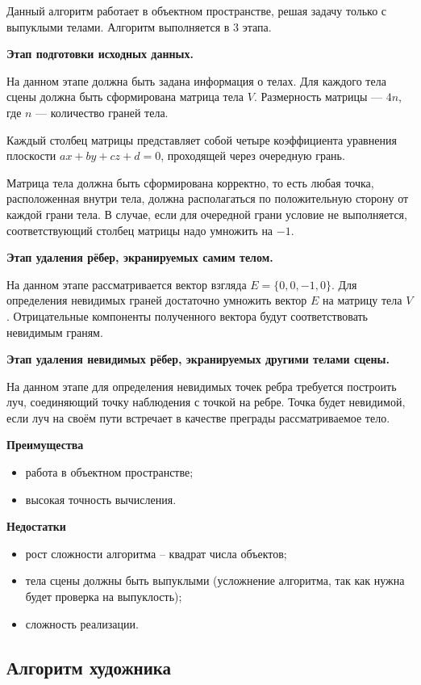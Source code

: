 Данный алгоритм работает в объектном пространстве, решая задачу только с выпуклыми телами. Алгоритм выполняется в 3 этапа. 

\textbf{Этап подготовки исходных данных.}

На данном этапе должна быть задана информация о телах. Для каждого тела сцены должна быть сформирована матрица тела $V$. Размерность матрицы --- $4n$, где $n$ --- количество граней тела. 

Каждый столбец матрицы представляет собой четыре коэффициента уравнения плоскости $ax+by+cz+d=0$, проходящей через очередную грань. 

Матрица тела должна быть сформирована корректно, то есть любая точка, расположенная внутри тела, должна располагаться по положительную сторону от каждой грани тела. В случае, если для очередной грани условие не выполняется, соответствующий столбец матрицы надо умножить на $-1$. 

\textbf{Этап удаления рёбер, экранируемых самим телом.}

На данном этапе рассматривается вектор взгляда $E = \{0, 0, -1, 0\}$. Для определения невидимых граней достаточно умножить вектор $E$ на матрицу тела $V$. Отрицательные компоненты полученного вектора будут соответствовать невидимым граням. 

\textbf{Этап удаления невидимых рёбер, экранируемых другими телами сцены.}

На данном этапе для определения невидимых точек ребра требуется построить луч, соединяющий точку наблюдения с точкой на ребре. Точка будет невидимой, если луч на своём пути встречает в качестве преграды рассматриваемое тело. 

\textbf{Преимущества}
\begin{itemize}[label=---]
	\item работа в объектном пространстве;
	\item высокая точность вычисления. 
\end{itemize}

\textbf{Недостатки}
\begin{itemize}[label=---]
	\item рост сложности алгоритма – квадрат числа объектов; 
	\item тела сцены должны быть выпуклыми (усложнение алгоритма, так как нужна будет проверка на выпуклость); 
	\item сложность реализации. 
\end{itemize}

\subsection{Алгоритм художника} 

